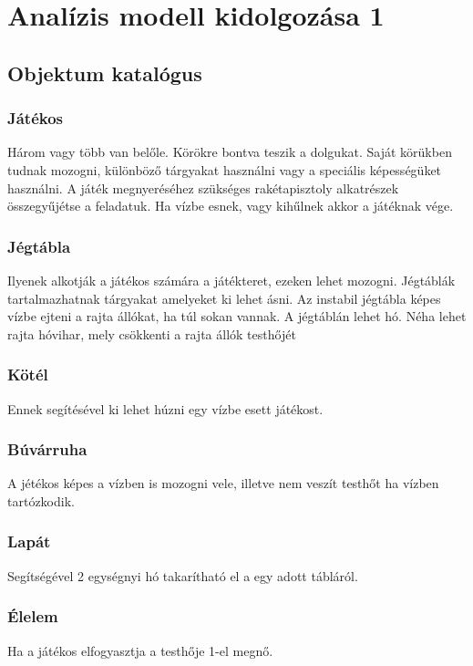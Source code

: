 %
\chapter{Analízis modell kidolgozása 1}

\thispagestyle{fancy}

\section{Objektum katalógus}

\subsection{Játékos}
Három vagy több van belőle. Körökre bontva teszik a dolgukat. Saját körükben tudnak mozogni, különböző tárgyakat használni vagy a speciális képességüket használni. A játék megnyeréséhez szükséges rakétapisztoly alkatrészek összegyűjétse a feladatuk. Ha vízbe esnek, vagy kihűlnek akkor a játéknak vége.

\subsection{Jégtábla}
Ilyenek alkotják a játékos számára a játékteret, ezeken lehet mozogni. Jégtáblák tartalmazhatnak tárgyakat amelyeket ki lehet ásni. Az instabil jégtábla képes vízbe ejteni a rajta állókat, ha túl sokan vannak. A jégtáblán lehet hó. Néha lehet rajta hóvihar, mely csökkenti a rajta állók testhőjét

\subsection{Kötél}
Ennek segítésével ki lehet húzni egy vízbe esett játékost.

\subsection{Búvárruha}
A jétékos képes a vízben is mozogni vele, illetve nem veszít testhőt ha vízben tartózkodik.

\subsection{Lapát}
Segítségével 2 egységnyi hó takarítható el a egy adott tábláról.

\subsection{Élelem}
Ha a játékos elfogyasztja a testhője 1-el megnő.


